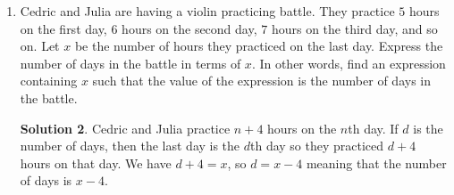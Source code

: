 \documentclass{article}
\theoremstyle{definition}
\newtheorem*{solution}{Solution}
\begin{document}
\begin{enumerate}
\begin{enumerate}
\begin{solution}
                If we needed to find the value of $a$ and $b$, we can use
                quadratics. The first equation can be rewritten as $b = 11 - a$,
                and substituting this into the second equation results in $a(11
                - a) = 13$. This equation can't be easily solved using the
                methods for linear equations that you're familiar with, but we
                might teach you how to solve this in the future. The solutions
                to this equation are $\frac{11}{2} - \frac{\sqrt{69}}{2}$ and
                $\frac{11}{2} + \frac{\sqrt{69}}{2}$, which are the two numbers
                that satisfy the properties stated in the problem.
            \end{solution}
        \end{enumerate}
        \item Cedric and Julia are having a violin practicing battle. They
        practice $5$ hours on the first day, $6$ hours on the second day, $7$
        hours on the third day, and so on. Let $x$ be the number of hours they
        practiced on the last day. Express the number of days in the battle in
        terms of $x$. In other words, find an expression containing $x$ such
        that the value of the expression is the number of days in the battle.
        \begin{solution}
            Cedric and Julia practice $n + 4$ hours on the $n$th day. If $d$ is
            the number of days, then the last day is the $d$th day so they
            practiced $d + 4$ hours on that day. We have $d + 4 = x$, so $d = x
            - 4$ meaning that the number of days is $x - 4$.
        \end{solution}
    \end{enumerate}
\end{document}
